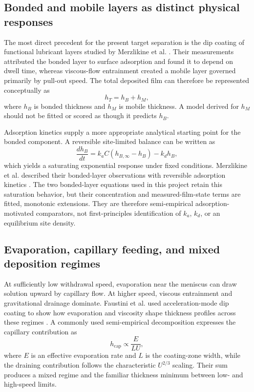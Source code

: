 \documentclass[11pt]{article}
\begin{document}
\subsection{Bonded and mobile layers as distinct physical responses}
The most direct precedent for the present target separation is the dip coating of functional lubricant layers studied by Merzlikine et al. \cite{merzlikine2005}. Their measurements attributed the bonded layer to surface adsorption and found it to depend on dwell time, whereas viscous-flow entrainment created a mobile layer governed primarily by pull-out speed. The total deposited film can therefore be represented conceptually as
\begin{equation}
h_T = h_B + h_M,
\end{equation}
where $h_B$ is bonded thickness and $h_M$ is mobile thickness. A model derived for $h_M$ should not be fitted or scored as though it predicts $h_B$.

Adsorption kinetics supply a more appropriate analytical starting point for the bonded component. A reversible site-limited balance can be written as
\begin{equation}
\frac{d h_B}{dt}=k_a C\left(h_{B,\infty}-h_B\right)-k_d h_B,
\end{equation}
which yields a saturating exponential response under fixed conditions. Merzlikine et al. described their bonded-layer observations with reversible adsorption kinetics \cite{merzlikine2005}. The two bonded-layer equations used in this project retain this saturation behavior, but their concentration and measured-film-state terms are fitted, monotonic extensions. They are therefore semi-empirical adsorption-motivated comparators, not first-principles identification of $k_a$, $k_d$, or an equilibrium site density.

\subsection{Evaporation, capillary feeding, and mixed deposition regimes}
At sufficiently low withdrawal speed, evaporation near the meniscus can draw solution upward by capillary flow. At higher speed, viscous entrainment and gravitational drainage dominate. Faustini et al. used acceleration-mode dip coating to show how evaporation and viscosity shape thickness profiles across these regimes \cite{faustini2014}. A commonly used semi-empirical decomposition expresses the capillary contribution as
\begin{equation}
h_{\mathrm{cap}} \propto \frac{E}{L U},
\end{equation}
where $E$ is an effective evaporation rate and $L$ is the coating-zone width, while the draining contribution follows the characteristic $U^{2/3}$ scaling. Their sum produces a mixed regime and the familiar thickness minimum between low- and high-speed limits.
\end{document}
